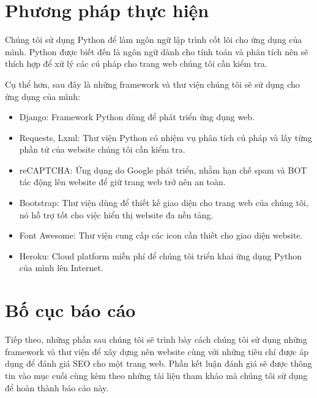 \section{Phương pháp thực hiện}
Chúng tôi sử dụng Python để làm ngôn ngữ lập trình cốt lõi cho ứng dụng của mình. Python được biết đến là ngôn ngữ dành cho tính toán và phân tích nên sẽ thích hợp để xử lý các cú pháp cho trang web chúng tôi cần kiểm tra.
\\\par
Cụ thể hơn, sau đây là những framework và thư viện chúng tôi sẽ sử dụng cho ứng dụng của mình:
\begin{itemize}
	\item Django: Framework Python dùng để phát triển ứng dụng web.
	\item Requests, Lxml: Thư viện Python có nhiệm vụ phân tích cú pháp và lấy từng phần tử của website chúng tôi cần kiểm tra.
	\item reCAPTCHA: Ứng dụng do Google phát triển, nhằm hạn chế spam và BOT tác động lên website để giữ trang web trở nên an toàn.
	\item Bootstrap: Thư viện dùng để thiết kế giao diện cho trang web của chúng tôi, nó hỗ trợ tốt cho việc hiển thị website đa nền tảng.
	\item Font Awesome: Thư viện cung cấp các icon cần thiết cho giao diện website.
	\item Heroku: Cloud platform miễn phí để chúng tôi triển khai ứng dụng Python của mình lên Internet.
\end{itemize}
\section{Bố cục báo cáo}
Tiếp theo, những phần sau chúng tôi sẽ trình bày cách chúng tôi sử dụng những framework và thư viện để xây dựng nên website cùng với những tiêu chí được áp dụng để đánh giá SEO cho một trang web. Phần kết luận đánh giá sẽ được thông tin vào mục cuối cùng kèm theo những tài liệu tham khảo mà chúng tôi sử dụng để hoàn thành báo cáo này.